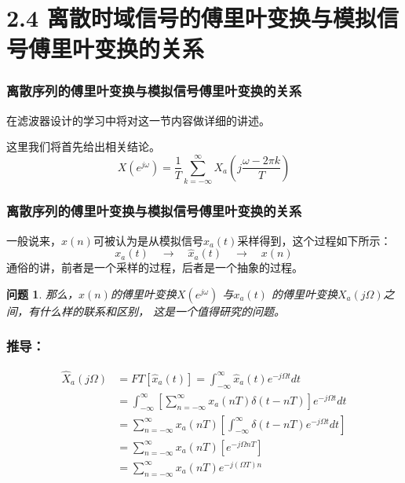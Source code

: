 \documentclass[notheorems,compress,mathserif,table]{beamer}
\newtheorem{wenti}{问题}
\begin{document}
\section{2.4 离散时域信号的傅里叶变换与模拟信号傅里叶变换的关系}
\begin{frame}\frametitle{离散序列的傅里叶变换与模拟信号傅里叶变换的关系}%
在滤波器设计的学习中将对这一节内容做详细的讲述。\newline

这里我们将首先给出相关结论。
\begin{equation*}%
X(e^{j\omega}) = \frac{1}{T}\sum_{k=-\infty}^{\infty}X_{a}(j\frac{\omega-2\pi k}{T})
\end{equation*}
\end{frame}

\begin{frame}\frametitle{离散序列的傅里叶变换与模拟信号傅里叶变换的关系}%

一般说来，$x(n)$可被认为是从模拟信号$x_a(t)$采样得到，这个过程如下所示：
$$x_a(t) \quad\longrightarrow  \quad \hat{x}_a(t) \quad\longrightarrow  \quad x(n) $$
通俗的讲，前者是一个采样的过程，后者是一个抽象的过程。

\begin{wenti}
那么，$x(n)$的傅里叶变换$X(e^{j\omega})$ 与$x_a(t)$ 的傅里叶变换$X_{a}(j\Omega)$之间，有什么样的联系和区别，
这是一个值得研究的问题。

\end{wenti}



\end{frame}






\begin{frame}[shrink]\frametitle{推导：}%

\begin{equation*}
\begin{split}
\hat{X}_a(j\Omega)
&=  FT\left[\hat{x}_a(t)\right] =\int_{-\infty}^{\infty}\hat{x}_a(t)e^{-j\Omega t}dt\\
&=  \int_{-\infty}^{\infty}\left[\sum_{n=-\infty}^{\infty}x_a(nT)\delta(t-nT)\right]e^{-j\Omega t}dt\\
&=  \sum_{n=-\infty}^{\infty}x_a(nT)\left[\int_{-\infty}^{\infty}\delta(t-nT)e^{-j\Omega t}dt\right]\\
&=  \sum_{n=-\infty}^{\infty}x_a(nT) \left[e^{-j\Omega nT} \right] \\
&=  \sum_{n=-\infty}^{\infty}x_a(nT)e^{-j(\Omega T) n}
\end{split}
\end{equation*}
\end{frame}
\end{document}
